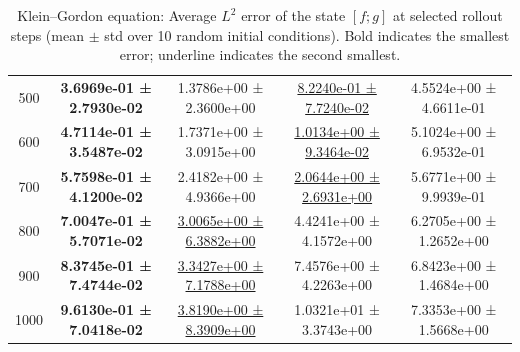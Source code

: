 \documentclass{article}
\theoremstyle{plain}
\theoremstyle{definition}
\theoremstyle{remark}
\begin{document}
\begin{table}[htbp]
\begin{tabular}{ccccc}
500 & \textbf{3.6969e-01 ± 2.7930e-02} & 1.3786e+00 ± 2.3600e+00 & \underline{8.2240e-01 ± 7.7240e-02} & 4.5524e+00 ± 4.6611e-01 \\
600 & \textbf{4.7114e-01 ± 3.5487e-02} & 1.7371e+00 ± 3.0915e+00 & \underline{1.0134e+00 ± 9.3464e-02} & 5.1024e+00 ± 6.9532e-01 \\
700 & \textbf{5.7598e-01 ± 4.1200e-02} & 2.4182e+00 ± 4.9366e+00 & \underline{2.0644e+00 ± 2.6931e+00} & 5.6771e+00 ± 9.9939e-01 \\
800 & \textbf{7.0047e-01 ± 5.7071e-02} & \underline{3.0065e+00 ± 6.3882e+00} & 4.4241e+00 ± 4.1572e+00 & 6.2705e+00 ± 1.2652e+00 \\
900 & \textbf{8.3745e-01 ± 7.4744e-02} & \underline{3.3427e+00 ± 7.1788e+00} & 7.4576e+00 ± 4.2263e+00 & 6.8423e+00 ± 1.4684e+00 \\
1000& \textbf{9.6130e-01 ± 7.0418e-02} & \underline{3.8190e+00 ± 8.3909e+00} & 1.0321e+01 ± 3.3743e+00 & 7.3353e+00 ± 1.5668e+00 \\
\hline
\end{tabular}
\caption{Klein--Gordon equation: Average $L^2$ error of the state $[f;g]$ at selected rollout steps
(mean $\pm$ std over 10 random initial conditions).
Bold indicates the smallest error; underline indicates the second smallest.}
\label{tab:kg-l2_errors_time_rows}
\end{table}
\end{document}
